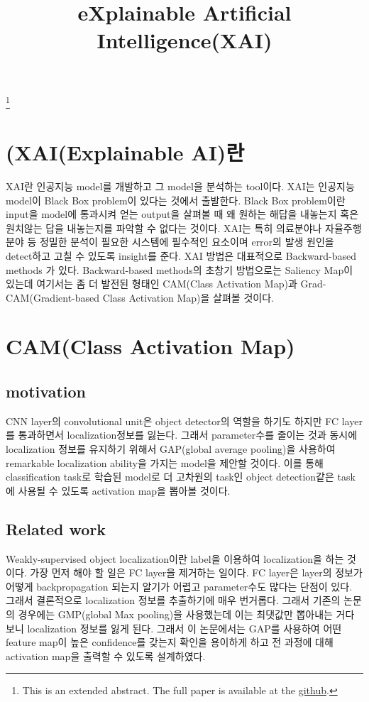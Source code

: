 \documentclass[extendedabs]{bmvc2k}
\begin{document}
\title{eXplainable Artificial Intelligence(XAI)}
\maketitle
\let\thefootnote\relax\footnote{This is an extended abstract. The full paper is available at the \href{https://github.com/LeeGwanHui/TIL/tree/main/deeplearning_ham}{github}. }
\vspace{-0.2in}

\section{(XAI(Explainable AI)란\cite{youtubeXAI}}
 \quad XAI란 인공지능 model를 개발하고 그 model을 분석하는 tool이다.\cite{h} XAI는 인공지능 model이 Black Box problem이 있다는 것에서 출발한다.
 Black Box problem이란 input을 model에 통과시켜 얻는 output을 살펴볼 때 왜 원하는 해답을 내놓는지 혹은 원치않는 답을 내놓는지를 파악할 수 없다는 것이다.
 XAI는 특히 의료분야나 자율주행 분야 등 정밀한 분석이 필요한 시스템에 필수적인 요소이며 error의 발생 원인을 detect하고 고칠 수 있도록 insight를 준다.
 XAI 방법은 대표적으로 Backward-based methods 가 있다. Backward-based methods의 초창기 방법으로는 Saliency Map이 있는데 여기서는 좀 더 발전된 형태인
 CAM(Class Activation Map)과 Grad-CAM(Gradient-based Class Activation Map)을 살펴볼 것이다.

\section{CAM(Class Activation Map)\cite{zhou2016learning}}

 \subsection{motivation}
 \quad CNN layer의 convolutional unit은 object detector의 역할을 하기도 하지만 FC layer를 통과하면서 localization정보를 잃는다.
 그래서 parameter수를 줄이는 것과 동시에 localization 정보를 유지하기 위해서 GAP(global average pooling)을 사용하여 remarkable localization ability을 가지는
 model을 제안할 것이다. 이를 통해 classification task로 학습된 model로 더 고차원의 task인 object detection같은 task에 사용될 수 있도록 activation map을 뽑아볼 것이다.

 \subsection{Related work}
 \quad Weakly-supervised object localization이란 label을 이용하여 localization을 하는 것이다. 가장 먼저 해야 할 일은 FC layer을 제거하는 일이다. FC layer은 
 layer의 정보가 어떻게 backpropagation 되는지 알기가 어렵고 parameter수도 많다는 단점이 있다. 그래서 결론적으로 localization 정보를 추출하기에 매우 번거롭다. 그래서
 기존의 논문의 경우에는 GMP(global Max pooling)을 사용했는데 이는 최댓값만 뽑아내는 거다보니 localization 정보를 잃게 된다. 그래서 이 논문에서는 GAP를 사용하여 
 어떤 feature map이 높은 confidence를 갖는지 확인을 용이하게 하고 전 과정에 대해 activation map을 출력할 수 있도록 설계하였다.
 
\end{document}

